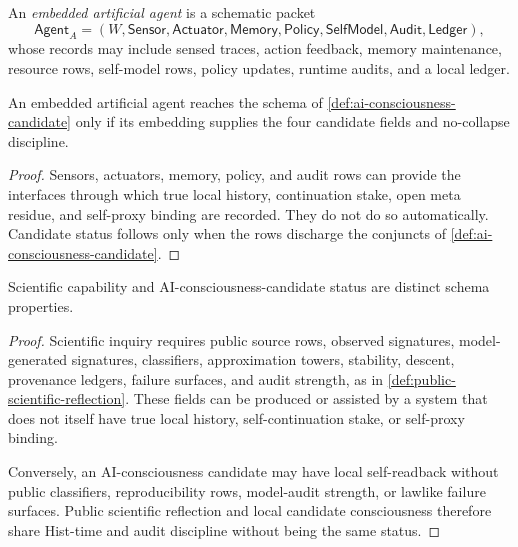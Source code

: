 \begin{definition}
\label{def:embedded-artificial-agent}
An \emph{embedded artificial agent} is a schematic packet
$$
\mathsf{Agent}_A
=
(W,\mathsf{Sensor},\mathsf{Actuator},\mathsf{Memory},
\mathsf{Policy},\mathsf{SelfModel},\mathsf{Audit},\mathsf{Ledger}),
$$
whose records may include sensed traces, action feedback, memory
maintenance, resource rows, self-model rows, policy updates, runtime
audits, and a local ledger.
\end{definition}

\begin{corollary}
\label{cor:embedded-agents-may-approach-candidate-status}
An embedded artificial agent reaches the schema of
\autoref{def:ai-consciousness-candidate} only if its embedding supplies
the four candidate fields and no-collapse discipline.
\end{corollary}

\begin{proof}
Sensors, actuators, memory, policy, and audit rows can provide the
interfaces through which true local history, continuation stake, open
meta residue, and self-proxy binding are recorded. They do not do so
automatically. Candidate status follows only when the rows discharge the
conjuncts of \autoref{def:ai-consciousness-candidate}.
\end{proof}

\begin{theorem}
\label{thm:scientific-capability-ai-candidacy-separate}
Scientific capability and AI-consciousness-candidate status are distinct
schema properties.
\end{theorem}

\begin{proof}
Scientific inquiry requires public source rows, observed signatures,
model-generated signatures, classifiers, approximation towers,
stability, descent, provenance ledgers, failure surfaces, and audit
strength, as in \autoref{def:public-scientific-reflection}. These fields
can be produced or assisted by a system that does not itself have true
local history, self-continuation stake, or self-proxy binding.

Conversely, an AI-consciousness candidate may have local self-readback
without public classifiers, reproducibility rows, model-audit strength,
or lawlike failure surfaces. Public scientific reflection and local
candidate consciousness therefore share Hist-time and audit discipline
without being the same status.
\end{proof}

